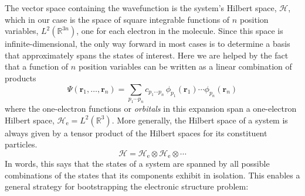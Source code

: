 The vector space containing the wavefunction is the system's Hilbert space,
\(\mathcal{H}\), which in our case is the space of square integrable functions
of \(n\) position variables,
\(
    L^2(\mathbb{R}^{3n})
\),
one for each electron in the molecule.
Since this space is infinite-dimensional, the only way forward in most cases is
to determine a basis that approximately spans the states of interest.
Here we are helped by the fact that a function of \(n\) position variables can
be written as a linear combination of products
\begin{equation}
    \Psi(\mathbf{r}_1, \dots, \mathbf{r}_n)
    =
    \sum_{p_1\cdots p_n}
    c_{p_1\cdots p_n}\,
    \phi_{p_1}(\mathbf{r}_1)
    \cdots
    \phi_{p_n}(\mathbf{r}_n)
\end{equation}
where the one-electron functions or {\itshape orbitals} in this expansion span a
one-electron Hilbert space,
\(
    \mathcal{H}_\mathrm{e}
    =
    L^2(\mathbb{R}^3)
\).
More generally, the Hilbert space of a system is always given by a tensor
product of the Hilbert spaces for its constituent particles.
\begin{equation}
    \mathcal{H}
    =
    \mathcal{H}_\mathrm{e}
    \otimes
    \mathcal{H}_\mathrm{e}
    \otimes
    \cdots
\end{equation}
In words, this says that the states of a system are spanned by all possible
combinations of the states that its components exhibit in isolation.
This enables a general strategy for bootstrapping the electronic structure
problem:
